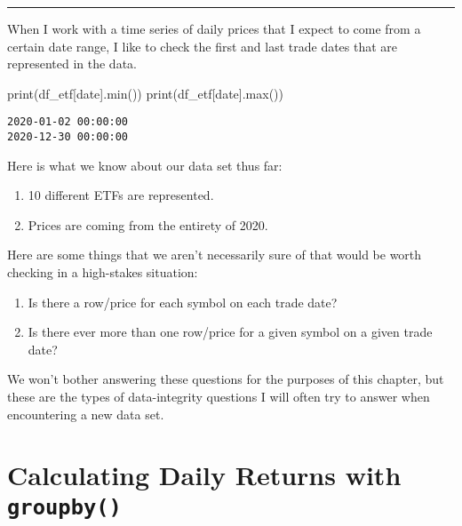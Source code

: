 \documentclass[
  letterpaper,
  DIV=11,
  numbers=noendperiod]{scrreprt}
\newenvironment{Shaded}{\begin{snugshade}}{\end{snugshade}}
\newcommand{\BuiltInTok}[1]{\textcolor[rgb]{0.00,0.23,0.31}{#1}}
\newcommand{\NormalTok}[1]{\textcolor[rgb]{0.00,0.23,0.31}{#1}}
\newcommand{\StringTok}[1]{\textcolor[rgb]{0.13,0.47,0.30}{#1}}
\begin{document}
\begin{center}\rule{0.5\linewidth}{0.5pt}\end{center}

When I work with a time series of daily prices that I expect to come
from a certain date range, I like to check the first and last trade
dates that are represented in the data.

\begin{Shaded}
\begin{Highlighting}[]
\BuiltInTok{print}\NormalTok{(df\_etf[}\StringTok{\textquotesingle{}date\textquotesingle{}}\NormalTok{].}\BuiltInTok{min}\NormalTok{())}
\BuiltInTok{print}\NormalTok{(df\_etf[}\StringTok{\textquotesingle{}date\textquotesingle{}}\NormalTok{].}\BuiltInTok{max}\NormalTok{())}
\end{Highlighting}
\end{Shaded}

\begin{verbatim}
2020-01-02 00:00:00
2020-12-30 00:00:00
\end{verbatim}

Here is what we know about our data set thus far:

\begin{enumerate}
\def\labelenumi{\arabic{enumi}.}
\item
  10 different ETFs are represented.
\item
  Prices are coming from the entirety of 2020.
\end{enumerate}

Here are some things that we aren't necessarily sure of that would be
worth checking in a high-stakes situation:

\begin{enumerate}
\def\labelenumi{\arabic{enumi}.}
\item
  Is there a row/price for each symbol on each trade date?
\item
  Is there ever more than one row/price for a given symbol on a given
  trade date?
\end{enumerate}

We won't bother answering these questions for the purposes of this
chapter, but these are the types of data-integrity questions I will
often try to answer when encountering a new data set.

\hypertarget{calculating-daily-returns-with-groupby}{%
\section{\texorpdfstring{Calculating Daily Returns with
\texttt{groupby()}}{Calculating Daily Returns with groupby()}}\label{calculating-daily-returns-with-groupby}}
\end{document}
